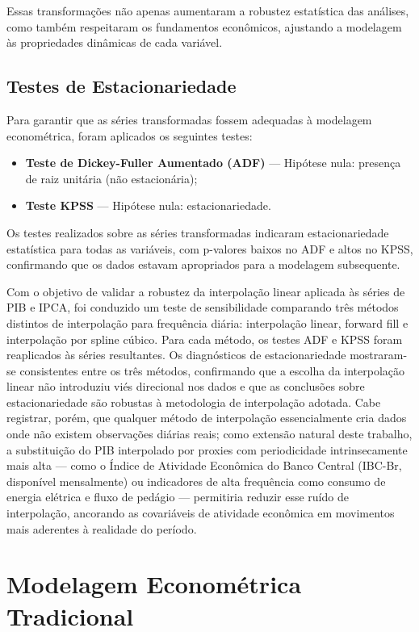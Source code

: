 \documentclass[	12pt, Times, openright, oneside, a4paper, english, brazil]{abntex2}
\begin{document}
Essas transformações não apenas aumentaram a robustez estatística das análises, como também respeitaram os fundamentos econômicos, ajustando a modelagem às propriedades dinâmicas de cada variável.

\subsection{Testes de Estacionariedade}

Para garantir que as séries transformadas fossem adequadas à modelagem econométrica, foram aplicados os seguintes testes:

\begin{itemize}
\item \textbf{Teste de Dickey-Fuller Aumentado (ADF)} — Hipótese nula: presença de raiz unitária (não estacionária);
\item \textbf{Teste KPSS} — Hipótese nula: estacionariedade.
\end{itemize}

Os testes realizados sobre as séries transformadas indicaram estacionariedade estatística para todas as variáveis, com p-valores baixos no ADF e altos no KPSS, confirmando que os dados estavam apropriados para a modelagem subsequente.

Com o objetivo de validar a robustez da interpolação linear aplicada às séries de PIB e IPCA, foi conduzido um teste de sensibilidade comparando três métodos distintos de interpolação para frequência diária: interpolação linear, forward fill e interpolação por spline cúbico. Para cada método, os testes ADF e KPSS foram reaplicados às séries resultantes. Os diagnósticos de estacionariedade mostraram-se consistentes entre os três métodos, confirmando que a escolha da interpolação linear não introduziu viés direcional nos dados e que as conclusões sobre estacionariedade são robustas à metodologia de interpolação adotada. Cabe registrar, porém, que qualquer método de interpolação essencialmente cria dados onde não existem observações diárias reais; como extensão natural deste trabalho, a substituição do PIB interpolado por proxies com periodicidade intrinsecamente mais alta — como o Índice de Atividade Econômica do Banco Central (IBC-Br, disponível mensalmente) ou indicadores de alta frequência como consumo de energia elétrica e fluxo de pedágio — permitiria reduzir esse ruído de interpolação, ancorando as covariáveis de atividade econômica em movimentos mais aderentes à realidade do período.

\section{Modelagem Econométrica Tradicional}
\end{document}
